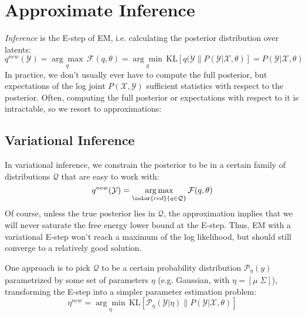 \documentclass[a4paper]{article}
\begin{document}
\section{Approximate Inference} \label{inference}
\emph{Inference} is the E-step of EM, i.e. calculating the posterior distribution over latents:
\[ q^{new}(\mathcal{Y}) = \underset{q}{\arg\max}\, \mathcal{F}(q,\theta) = \underset{q}{\arg\min}\, \textrm{KL}\left[q(\mathcal{Y}\|P(\mathcal{Y}|\mathcal{X},\theta)\right] = P(\mathcal{Y}|\mathcal{X},\theta) \]
In practice, we don't usually ever have to compute the full posterior, but expectations of the log joint $P(\mathcal{X},\mathcal{Y})$ sufficient statistics with respect to the posterior. Often, computing the full posterior or expectations with respect to it is intractable, so we resort to approximations:

\subsection{Variational Inference}
In variational inference, we constrain the posterior to be in a certain family of distributions $\mathcal{Q}$ that are easy to work with:
\[ q^{new}(\mathcal{Y}) = \underset{\color{red}{q\in\mathcal{Q}}}{\arg\max}\, \mathcal{F}(q,\theta) \]
Of course, unless the true posterior lies in $\mathcal{Q}$, the approximation implies that we will never saturate the free energy lower bound at the E-step. Thus, EM with a variational E-step won't reach a maximum of the log likelihood, but should still converge to a relatively good solution.

One approach is to pick $\mathcal{Q}$ to be a certain probability distribution $\mathcal{P}_\eta(y)$ parametrized by some set of parameters $\eta$ (e.g. Gaussian, with $\eta = [\mu \; \Sigma]$), transforming the E-step into a simpler parameter estimation problem:
\[ \eta^{new} = \underset{\eta}{\arg\min}\, \textrm{KL}\left[\mathcal{P}_\eta(\mathcal{Y}|\eta) \| P(\mathcal{Y}|\mathcal{X},\theta)\right] \]
\end{document}
